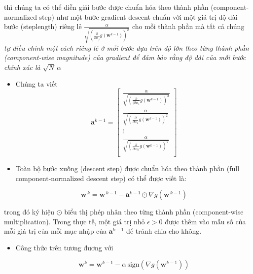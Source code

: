 \documentclass{book}
\begin{document}
thì chúng ta có thể diễn giải bước được chuẩn hóa theo thành phần (component-normalized step) như một bước gradient descent chuẩn với một giá trị độ dài bước (steplength) riêng lẻ $\frac{\alpha}{\sqrt{\left(\frac{\partial}{\partial w_j} g\left(\mathbf{w}^{k-1}\right)\right)^2}}$ cho mỗi thành phần mà tất cả chúng \textit{tự điều chỉnh một cách riêng lẻ ở mỗi bước dựa trên độ lớn theo từng thành phần (component-wise magnitude) của gradient để đảm bảo rằng độ dài của mỗi bước chính xác là $\sqrt{N} \, \alpha$}
\begin{itemize}
    \item Chúng ta viết 
    \begin{equation*}
        \mathbf{a}^{k-1} = \begin{bmatrix} 
        \frac{\alpha}{\sqrt{\left(\frac{\partial}{(\partial w_1} g\left(\mathbf{w}^{k-1}\right)\right)^2}}  \\
        \frac{\alpha}{\sqrt{\left(\frac{\partial}{\partial w_2} g\left(\mathbf{w}^{k-1}\right)\right)^2}}  \\
        \vdots \\
        \frac{\alpha}{\sqrt{\left(\frac{\partial}{\partial w_N} g\left(\mathbf{w}^{k-1}\right)\right)^2}}  \\
        \end{bmatrix}
    \end{equation*}
    \item Toàn bộ bước xuống (descent step) được chuẩn hóa theo thành phần (full component-normalized descent step) có thể được viết là:
        
    \begin{equation*}
        \mathbf{w}^{\,k} = \mathbf{w}^{\,k-1} - \mathbf{a}^{k-1} \odot \nabla g(\mathbf{w}^{\,k-1})
    \end{equation*}

\end{itemize}
trong đó ký hiệu $\odot$ biểu thị phép nhân theo từng thành phần (component-wise multiplication). Trong thực tế, một giá trị nhỏ $\epsilon > 0$ được thêm vào mẫu số của mỗi giá trị của mỗi mục nhập của $\mathbf{a}^{k-1}$ để tránh chia cho không. 
\begin{itemize}
    \item Công thức trên tương đương với

    \begin{equation*}
        \mathbf{w}^k = \mathbf{w}^{k-1} - \alpha \, \text{sign}\left(\nabla g\left(\mathbf{w}^{k-1}\right)\right)
    \end{equation*}
\end{itemize}
\end{document}
